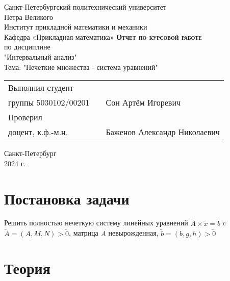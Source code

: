 \documentclass[12pt]{article}
\begin{document}
  
  \begin{titlepage}
        \begin{center}
            \large
            Санкт-Петербургский политехнический университет\\Петра Великого\\
            \vspace{0.5cm}
            Институт прикладной математики и механики\\
            \vspace{0.25cm}
            Кафедра «Прикладная математика»
            \vfill
            \textsc{\LARGE\textbf{Отчет по курсовой работе}}\\[5mm]
            \Large
            по дисциплине\\"Интервальный анализ" \\
            Тема: "Нечеткие множества - система уравнений"
        \end{center}
        \vfill
        \begin{tabular}{l p{175pt} l}
            Выполнил студент \\ группы 5030102/00201 && Сон Артём Игоревич
            \vspace{0.25cm}
            \\Проверил \\ доцент, к.ф.-м.н. && Баженов Александр Николаевич
        \end{tabular}
        \vfill
        \begin{center}
            Санкт-Петербург \\ 2024 г.
        \end{center}


\end{titlepage}

\section{Постановка задачи}

Решить полностью нечеткую систему линейных уравнений $\tilde{A} \times \tilde{x} = \tilde{b}$ c 
$\tilde{A} = (A, M, N) > \tilde{0}$, матрица $A$ невырожденная, $\tilde{b} = (b,
g, h) > \tilde{0}$ 



\section{Теория}
\end{document}
